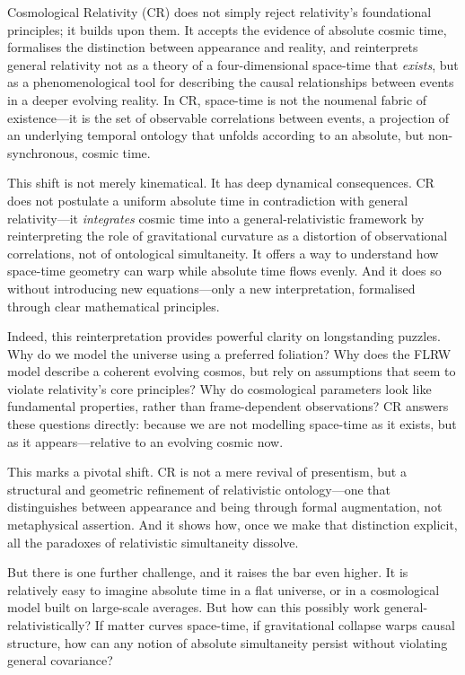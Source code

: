 \documentclass[12pt]{book}
\begin{document}
Cosmological Relativity (CR) does not simply reject relativity's foundational principles; it builds upon them. It accepts the evidence of absolute cosmic time, formalises the distinction between appearance and reality, and reinterprets general relativity not as a theory of a four-dimensional space-time that \textit{exists}, but as a phenomenological tool for describing the causal relationships between events in a deeper evolving reality. In CR, space-time is not the noumenal fabric of existence---it is the set of observable correlations between events, a projection of an underlying temporal ontology that unfolds according to an absolute, but non-synchronous, cosmic time.

This shift is not merely kinematical. It has deep dynamical consequences. CR does not postulate a uniform absolute time in contradiction with general relativity---it \textit{integrates} cosmic time into a general-relativistic framework by reinterpreting the role of gravitational curvature as a distortion of observational correlations, not of ontological simultaneity. It offers a way to understand how space-time geometry can warp while absolute time flows evenly. And it does so without introducing new equations---only a new interpretation, formalised through clear mathematical principles.

Indeed, this reinterpretation provides powerful clarity on longstanding puzzles. Why do we model the universe using a preferred foliation? Why does the FLRW model describe a coherent evolving cosmos, but rely on assumptions that seem to violate relativity's core principles? Why do cosmological parameters look like fundamental properties, rather than frame-dependent observations? CR answers these questions directly: because we are not modelling space-time as it exists, but as it appears---relative to an evolving cosmic now.

This marks a pivotal shift. CR is not a mere revival of presentism, but a structural and geometric refinement of relativistic ontology---one that distinguishes between appearance and being through formal augmentation, not metaphysical assertion. And it shows how, once we make that distinction explicit, all the paradoxes of relativistic simultaneity dissolve.

But there is one further challenge, and it raises the bar even higher. It is relatively easy to imagine absolute time in a flat universe, or in a cosmological model built on large-scale averages. But how can this possibly work general-relativistically? If matter curves space-time, if gravitational collapse warps causal structure, how can any notion of absolute simultaneity persist without violating general covariance? 
\end{document}
